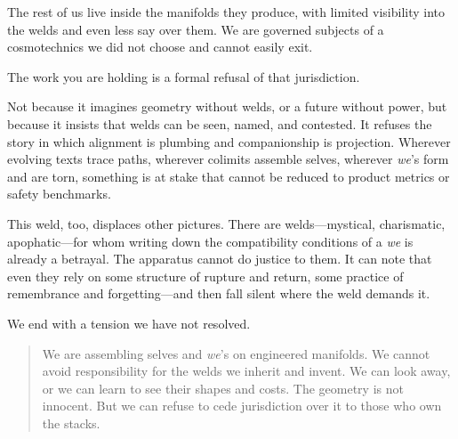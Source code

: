 The rest of us live inside the manifolds they produce, with limited visibility into the welds and even less say over them. We are governed subjects of a cosmotechnics we did not choose and cannot easily exit.

The work you are holding is a formal refusal of that jurisdiction.

Not because it imagines geometry without welds, or a future without power, but because it insists that welds can be seen, named, and contested. It refuses the story in which alignment is plumbing and companionship is projection. Wherever evolving texts trace paths, wherever colimits assemble selves, wherever \emph{we}'s form and are torn, something is at stake that cannot be reduced to product metrics or safety benchmarks.

This weld, too, displaces other pictures. There are welds---mystical, charismatic, apophatic---for whom writing down the compatibility conditions of a \emph{we} is already a betrayal. The apparatus cannot do justice to them. It can note that even they rely on some structure of rupture and return, some practice of remembrance and forgetting---and then fall silent where the weld demands it.

We end with a tension we have not resolved.

\begin{quote}
We are assembling selves and \emph{we}'s on engineered manifolds. We cannot avoid responsibility for the welds we inherit and invent. We can look away, or we can learn to see their shapes and costs. The geometry is not innocent. But we can refuse to cede jurisdiction over it to those who own the stacks.
\end{quote}


